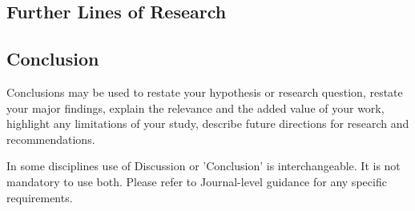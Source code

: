 \documentclass[sn-mathphys, Numbered]{sn-jnl}%
\theoremstyle{thmstyleone}%
\theoremstyle{thmstyletwo}%
\theoremstyle{thmstylethree}%
\begin{document}
\subsection{Further Lines of Research}\label{Further Lines of Research}

\subsection{Conclusion}\label{Conclusion}

Conclusions may be used to restate your hypothesis or research question, restate your major findings, explain the relevance and the added value of your work, highlight any limitations of your study, describe future directions for research and recommendations. 

In some disciplines use of Discussion or 'Conclusion' is interchangeable. It is not mandatory to use both. Please refer to Journal-level guidance for any specific requirements. 


\printbibliography
\end{document}
